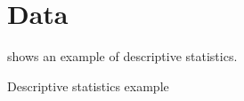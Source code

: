 \section{Data}
\label{s:data}
 shows an example of descriptive statistics.

\begin{table}
    \centering
    \caption{Descriptive statistics example}
    \label{t:descriptive}
    
\end{table}

\begin{figure}
    \centering
\end{figure}
